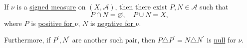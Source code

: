\begin{theorem}\label{thm:Hahn-decomposition-theorem}
  If \(\nu\) is a \hyperref[def:signed-measure]{signed measure} on \((X, \mathcal{A})\), then there exist \(P, N \in \mathcal{A}\) such that
  \[
    P \cap N = \varnothing, \quad P \cup N = X,
  \]
  where \(P\) is \hyperref[def:positive-set-for-a-signed-measure]{positive for \(\nu\)}, \(N\) is \hyperref[def:negative-set-for-a-signed-measure]{negative for \(\nu\)}.

  Furthermore, if \(P^\prime ,N^\prime\) are another such pair, then \(P \triangle P^\prime = N \triangle N^\prime\) is \hyperref[def:mu-null-set]{null} for \(\nu\).
  \begin{figure}[H]
    \centering
    \label{fig:thm:Hahn-decomposition-theorem}
  \end{figure}
\end{theorem}